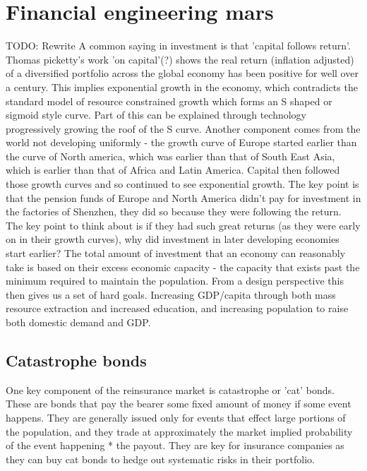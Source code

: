 \documentclass[10pt]{article}
\begin{document}
\section{Financial engineering mars}

TODO: Rewrite
A common saying in investment is that 'capital follows return'. Thomas picketty's work 'on capital'(?) shows the real return (inflation adjusted) of a diversified portfolio across the global economy has been positive for well over a century. This implies exponential growth in the economy, which contradicts the standard model of resource constrained growth which forms an S shaped or sigmoid style curve. Part of this can be explained through technology progressively growing the roof of the S curve. Another component comes from the world not developing uniformly - the growth curve of Europe started earlier than the curve of North america, which was earlier than that of South East Asia, which is earlier than that of Africa and Latin America. Capital then followed those growth curves and so continued to see exponential growth. The key point is that the pension funds of Europe and North America didn't pay for investment in the factories of Shenzhen, they did so because they were following the return. The key point to think about is if they had such great returns (as they were early on in their growth curves), why did investment in later developing economies start earlier? The total amount of investment that an economy can reasonably take is based on their excess economic capacity - the capacity that exists past the minimum required to maintain the population. From a design perspective this then gives us a set of hard goals. Increasing GDP/capita through both mass resource extraction and increased education, and increasing population to raise both domestic demand and GDP.

\subsection{Catastrophe bonds}
One key component of the reinsurance market is catastrophe or 'cat' bonds. These are bonds that pay the bearer some fixed amount of money if some event happens. They are generally issued only for events that effect large portions of the population, and they trade at approximately the market implied probability of the event happening * the payout. They are key for insurance companies as they can buy cat bonds to hedge out systematic risks in their portfolio.
\end{document}

